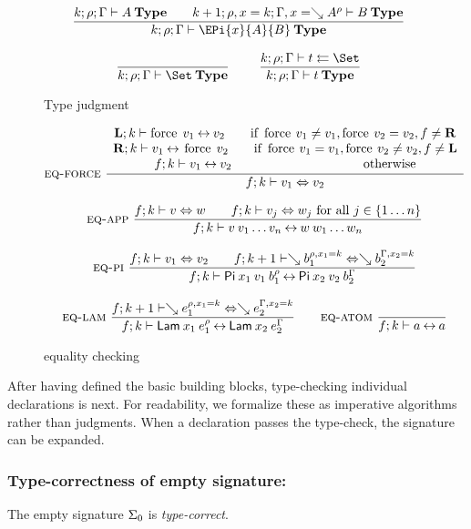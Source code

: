 \begin{figure}[htp]
\begin{gather*}
\nru{}
{\IsType{k}{\rho}{\Gamma}{A}
\qquad
\IsType{k+1}{\ins{\rho}{x}{k}}{\ins{\Gamma}{x}{\wh \cl{A}{\rho}}}{B}}
{\IsType{k}{\rho}{\Gamma}{\EPi{x}{A}{B}}}
\\[2ex]
\nru{}{}{\IsType{k}{\rho}{\Gamma}{\Set}}
\qquad
\nru{}
{\Check{k}{\rho}{\Gamma}{t}{\Set}}
{\IsType{k}{\rho}{\Gamma}{t}}
\end{gather*}
\caption{Type judgment}
\label{ftype}
\end{figure}

\begin{figure}[htp]
\begin{gather*}
\mbox{\sc eq-force}\ \dfrac{\begin{array}[b]{c}\mathbf{L};k\vdash\operatorname{force} \; v_1{\:\leftrightarrow\:}v_2 \qquad \mbox{if } \operatorname{force} \: v_1 \neq v_1 , \operatorname{force} \: v_2 = v_2  , f \neq \mathbf{R}
\\\mathbf{R};k\vdash v_1{\:\leftrightarrow\:}\operatorname{force} \; v_2 \qquad \mbox{if } \operatorname{force} \: v_1 = v_1 , \operatorname{force} \: v_2 \neq v_2 , f \neq \mathbf{L} \\f;k\vdash v_1{\:\leftrightarrow\:}v_2 \qquad \qquad \qquad \qquad \qquad \mbox{ otherwise}\end{array}}{f;k\vdash v_1\Leftrightarrow v_2}
\\[2ex]
\mbox{\sc eq-app}\ \dfrac{f;k\vdash v\Leftrightarrow w \qquad
f;k\vdash v_j\Leftrightarrow w_j \mbox{ for all } j \in \{ 1 \ldots n\}}{f;k\vdash v \: v_1 \ldots v_n{\:\leftrightarrow\:}w \: w_1 \ldots w_n}
\\[2ex]
\mbox{\sc eq-pi}\ \dfrac{f;k\vdash v_1\Leftrightarrow v_2
\qquad
f;k+1\vdash\searrow b_1^{\rho,x_1=k}\Leftrightarrow\searrow b_2^{\Gamma,x_2=k}}{f;k\vdash\mathsf{Pi} \: x_1 \: v_1 \: b_1^{\rho}{\:\leftrightarrow\:}\mathsf{Pi} \: x_2 \: v_2 \: b_2^{\Gamma}}
\\[2ex]
\mbox{\sc eq-lam}\ \dfrac{f;k+1\vdash\searrow e_1^{\rho,x_1=k}\Leftrightarrow\searrow e_2^{\Gamma,x_2=k}}{f;k\vdash\mathsf{Lam} \: x_1 \: e_1^{\rho}{\:\leftrightarrow\:}\mathsf{Lam} \: x_2 \: e_2^{\Gamma}}
\qquad
\mbox{\sc eq-atom}\ \dfrac{}{f;k\vdash a{\:\leftrightarrow\:}a}
\end{gather*}
\caption{equality checking}
\label{feq}
\end{figure}

After having defined the basic building blocks, type-checking individual declarations is next.
For readability, we formalize these as imperative algorithms rather than judgments. 
When a declaration passes the type-check, the signature can be expanded. 
\subsubsection{Type-correctness of empty signature:}
The empty signature $\Sigma_0$ is \emph{type-correct}.

